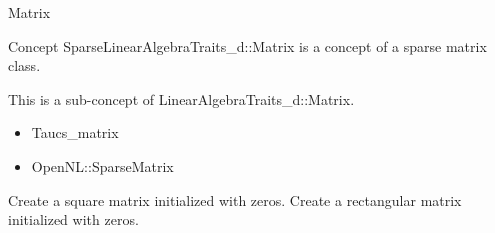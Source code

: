 

\begin{ccRefConcept}[SparseLinearAlgebra_d::]{Matrix}


\ccDefinition

Concept SparseLinearAlgebraTraits\_d::Matrix is a concept of a sparse matrix class.


\ccRefines

This is a sub-concept of LinearAlgebraTraits\_d::Matrix.


\ccHasModels

\begin{itemize}
\item Taucs\_matrix\item OpenNL::SparseMatrix \end{itemize}






\ccTypes


{
}


\ccCreation
{}  %

{
Create a square matrix initialized with zeros.
}
{
Create a rectangular matrix initialized with zeros.
}


\ccOperations


\end{ccRefConcept}
